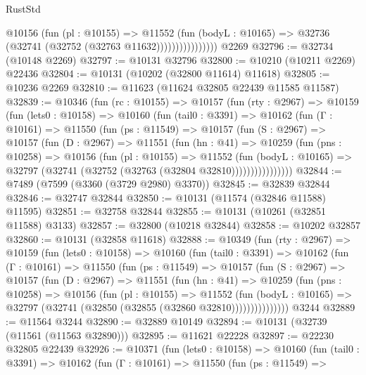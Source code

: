 \begin{lexlean}{RustStd}
\begin{coremodule}
                        @10156
                          (fun (pl : @10155) =>
                          @11552
                            (fun (bodyL : @10165) =>
                            @32736 (@32741 (@32752 (@32763 @11632))))))))))))))))
    @2269
@32796 := @32734 (@10148 @2269)
@32797 := @10131 @32796
@32800 := @10210 (@10211 @2269) @22436
@32804 := @10131 (@10202 (@32800 @11614) @11618)
@32805 := @10236 @2269
@32810 := @11623 (@11624 @32805 @22439 @11585 @11587)
@32839 := @10346
    (fun (rc : @10155) =>
    @10157
      (fun (rty : @2967) =>
      @10159
        (fun (lets0 : @10158) =>
        @10160
          (fun (tail0 : @3391) =>
          @10162
            (fun (Γ : @10161) =>
            @11550
              (fun (ps : @11549) =>
              @10157
                (fun (S : @2967) =>
                @10157
                  (fun (D : @2967) =>
                  @11551
                    (fun (hn : @41) =>
                    @10259
                      (fun (pns : @10258) =>
                      @10156
                        (fun (pl : @10155) =>
                        @11552
                          (fun (bodyL : @10165) =>
                          @32797 (@32741 (@32752 (@32763 (@32804 @32810))))))))))))))))
@32844 := @7489 (@7599 (@3360 (@3729 @2980) @3370))
@32845 := @32839 @32844
@32846 := @32747 @32844
@32850 := @10131 (@11574 (@32846 @11588) @11595)
@32851 := @32758 @32844
@32855 := @10131 (@10261 (@32851 @11588) @3133)
@32857 := @32800 (@10218 @32844)
@32858 := @10202 @32857
@32860 := @10131 (@32858 @11618)
@32888 := @10349
    (fun (rty : @2967) =>
    @10159
      (fun (lets0 : @10158) =>
      @10160
        (fun (tail0 : @3391) =>
        @10162
          (fun (Γ : @10161) =>
          @11550
            (fun (ps : @11549) =>
            @10157
              (fun (S : @2967) =>
              @10157
                (fun (D : @2967) =>
                @11551
                  (fun (hn : @41) =>
                  @10259
                    (fun (pns : @10258) =>
                    @10156
                      (fun (pl : @10155) =>
                      @11552
                        (fun (bodyL : @10165) =>
                        @32797 (@32741 (@32850 (@32855 (@32860 @32810)))))))))))))))
    @3244
@32889 := @11564 @3244
@32890 := @32889 @10149
@32894 := @10131 (@32739 (@11561 (@11563 @32890)))
@32895 := @11621 @22228
@32897 := @22230 @32805 @22439
@32926 := @10371
    (fun (lets0 : @10158) =>
    @10160
      (fun (tail0 : @3391) =>
      @10162
        (fun (Γ : @10161) =>
        @11550
          (fun (ps : @11549) =>

\end{coremodule}
\end{lexlean}

